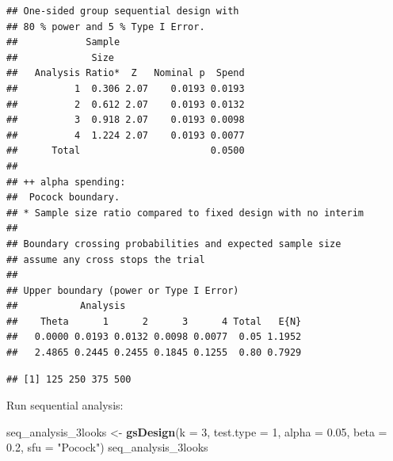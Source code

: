 \documentclass[]{book}
\newenvironment{Shaded}{\begin{snugshade}}{\end{snugshade}}
\newcommand{\DataTypeTok}[1]{\textcolor[rgb]{0.13,0.29,0.53}{#1}}
\newcommand{\DecValTok}[1]{\textcolor[rgb]{0.00,0.00,0.81}{#1}}
\newcommand{\FloatTok}[1]{\textcolor[rgb]{0.00,0.00,0.81}{#1}}
\newcommand{\KeywordTok}[1]{\textcolor[rgb]{0.13,0.29,0.53}{\textbf{#1}}}
\newcommand{\NormalTok}[1]{#1}
\newcommand{\OperatorTok}[1]{\textcolor[rgb]{0.81,0.36,0.00}{\textbf{#1}}}
\newcommand{\StringTok}[1]{\textcolor[rgb]{0.31,0.60,0.02}{#1}}
\begin{document}
\begin{verbatim}
## One-sided group sequential design with
## 80 % power and 5 % Type I Error.
##            Sample
##             Size 
##   Analysis Ratio*  Z   Nominal p  Spend
##          1  0.306 2.07    0.0193 0.0193
##          2  0.612 2.07    0.0193 0.0132
##          3  0.918 2.07    0.0193 0.0098
##          4  1.224 2.07    0.0193 0.0077
##      Total                       0.0500 
## 
## ++ alpha spending:
##  Pocock boundary.
## * Sample size ratio compared to fixed design with no interim
## 
## Boundary crossing probabilities and expected sample size
## assume any cross stops the trial
## 
## Upper boundary (power or Type I Error)
##           Analysis
##    Theta      1      2      3      4 Total   E{N}
##   0.0000 0.0193 0.0132 0.0098 0.0077  0.05 1.1952
##   2.4865 0.2445 0.2455 0.1845 0.1255  0.80 0.7929
\end{verbatim}

\begin{Shaded}
\end{Shaded}

\begin{verbatim}
## [1] 125 250 375 500
\end{verbatim}

Run sequential analysis:

\begin{Shaded}
\begin{Highlighting}[]
\NormalTok{seq_analysis_3looks <-}\StringTok{ }\KeywordTok{gsDesign}\NormalTok{(}\DataTypeTok{k =} \DecValTok{3}\NormalTok{,}
                                \DataTypeTok{test.type =} \DecValTok{1}\NormalTok{,}
                                \DataTypeTok{alpha =} \FloatTok{0.05}\NormalTok{,}
                                \DataTypeTok{beta =} \FloatTok{0.2}\NormalTok{,}
                                \DataTypeTok{sfu =} \StringTok{"Pocock"}\NormalTok{)}
\NormalTok{seq_analysis_3looks}
\end{Highlighting}
\end{Shaded}
\end{document}
